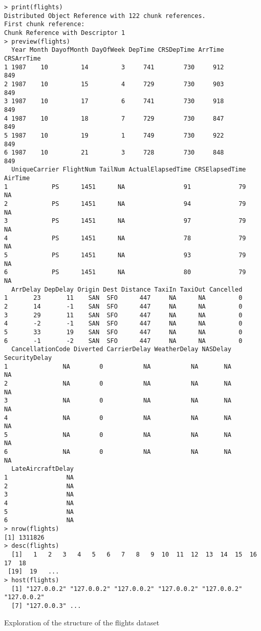 \begin{listing}%
\begin{verbatim}
> print(flights)
Distributed Object Reference with 122 chunk references.
First chunk reference:
Chunk Reference with Descriptor 1
> preview(flights)
  Year Month DayofMonth DayOfWeek DepTime CRSDepTime ArrTime CRSArrTime
1 1987    10         14         3     741        730     912        849
2 1987    10         15         4     729        730     903        849
3 1987    10         17         6     741        730     918        849
4 1987    10         18         7     729        730     847        849
5 1987    10         19         1     749        730     922        849
6 1987    10         21         3     728        730     848        849
  UniqueCarrier FlightNum TailNum ActualElapsedTime CRSElapsedTime AirTime
1            PS      1451      NA                91             79      NA
2            PS      1451      NA                94             79      NA
3            PS      1451      NA                97             79      NA
4            PS      1451      NA                78             79      NA
5            PS      1451      NA                93             79      NA
6            PS      1451      NA                80             79      NA
  ArrDelay DepDelay Origin Dest Distance TaxiIn TaxiOut Cancelled
1       23       11    SAN  SFO      447     NA      NA         0
2       14       -1    SAN  SFO      447     NA      NA         0
3       29       11    SAN  SFO      447     NA      NA         0
4       -2       -1    SAN  SFO      447     NA      NA         0
5       33       19    SAN  SFO      447     NA      NA         0
6       -1       -2    SAN  SFO      447     NA      NA         0
  CancellationCode Diverted CarrierDelay WeatherDelay NASDelay SecurityDelay
1               NA        0           NA           NA       NA            NA
2               NA        0           NA           NA       NA            NA
3               NA        0           NA           NA       NA            NA
4               NA        0           NA           NA       NA            NA
5               NA        0           NA           NA       NA            NA
6               NA        0           NA           NA       NA            NA
  LateAircraftDelay
1                NA
2                NA
3                NA
4                NA
5                NA
6                NA
> nrow(flights)
[1] 1311826
> desc(flights)
  [1]   1   2   3   4   5   6   7   8   9  10  11  12  13  14  15  16  17  18
 [19]  19   ...
> host(flights)
  [1] "127.0.0.2" "127.0.0.2" "127.0.0.2" "127.0.0.2" "127.0.0.2" "127.0.0.2"
  [7] "127.0.0.3" ...
\end{verbatim}
\caption{Exploration of the structure of the flights dataset}\label{src:flights-structure}
\end{listing}


